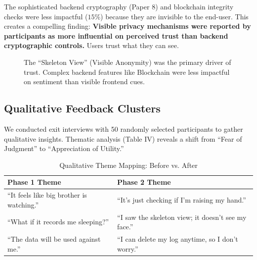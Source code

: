\documentclass[conference]{IEEEtran}
\begin{document}
The sophisticated backend cryptography (Paper 8) and blockchain integrity checks were less impactful ($15\%$) because they are invisible to the end-user. This creates a compelling finding: \textbf{Visible privacy mechanisms were reported by participants as more influential on perceived trust than backend cryptographic controls.} Users trust what they can see.

\begin{figure}[htbp]
\centering
{}
\caption{The ``Skeleton View'' (Visible Anonymity) was the primary driver of trust. Complex backend features like Blockchain were less impactful on sentiment than visible frontend cues.}
\label{fig:factors}
\end{figure}

\subsection{Qualitative Feedback Clusters}
We conducted exit interviews with 50 randomly selected participants to gather qualitative insights. Thematic analysis (Table IV) reveals a shift from ``Fear of Judgment'' to ``Appreciation of Utility.''

\begin{table}[htbp]
\caption{Qualitative Theme Mapping: Before vs. After}
\begin{center}
\begin{tabular}{|p{3cm}|p{4.5cm}|}
\hline
\textbf{Phase 1 Theme} & \textbf{Phase 2 Theme} \\
\hline
``It feels like big brother is watching.'' & ``It's just checking if I'm raising my hand.'' \\
\hline
``What if it records me sleeping?'' & ``I saw the skeleton view; it doesn't see my face.'' \\
\hline
``The data will be used against me.'' & ``I can delete my log anytime, so I don't worry.'' \\
\hline
\end{tabular}
\end{center}
\label{tab:themes}
\end{table}
\end{document}
